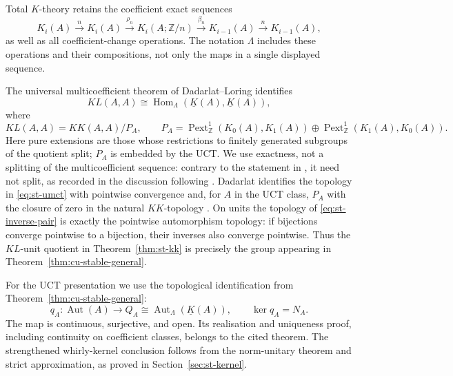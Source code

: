 Total $K$-theory retains the coefficient exact sequences 
\begin{equation}  \label{eq:st-bockstein}
K_i(A)\xrightarrow{n}K_i(A) \xrightarrow{\rho_n}K_i(A;\mathbb{Z}/n) \xrightarrow{\beta_n}K_{i-1}(A) \xrightarrow{n}K_{i-1}(A),
\end{equation}
as well as all coefficient-change operations. The notation $\Lambda$
includes these operations and their compositions, not only the maps in a
single displayed sequence.

The universal multicoefficient theorem of Dadarlat--Loring \cite{DadarlatLoring1996}
identifies 
\begin{equation}  \label{eq:st-umct}
KL(A,A)\cong\operatorname{Hom}_\Lambda(\underline K(A),\underline K(A)),
\end{equation}
where 
\begin{equation*}
KL(A,A)=KK(A,A)/P_A,\qquad  P_A=\operatorname{Pext}^1_\mathbb{Z}(K_0(A),K_1(A))  \oplus \operatorname{Pext}^1_\mathbb{Z}(K_1(A),K_0(A)). 
\end{equation*}
Here pure extensions are those whose restrictions to finitely generated
subgroups of the quotient split; $P_A$ is embedded by the UCT. We use
exactness, not a splitting of the multicoefficient sequence: contrary to the
statement in \cite{DadarlatLoring1996}, it need not split, as recorded in the discussion
following \cite[Theorem~1.3]{EilersRestorffRuiz2011}. Dadarlat identifies the topology in \eqref{eq:st-umct} with pointwise
convergence and, for $A$ in the UCT class, $P_A$ with the closure of zero
in the natural $KK$-topology \cite[Theorem~4.1 and p.~411]{Dadarlat2005}. On
units the topology of \eqref{eq:st-inverse-pair} is exactly the pointwise
automorphism topology: if bijections converge pointwise to a bijection,
their inverses also converge pointwise. Thus the $KL$-unit quotient in
Theorem~\ref{thm:st-kk} is precisely the group appearing in Theorem~\ref{thm:cu-stable-general}.

For the UCT presentation we use the topological identification from
Theorem~\ref{thm:cu-stable-general}:
\[
 q_A:\operatorname{Aut}(A)\longrightarrow Q_A\cong\operatorname{Aut}_\Lambda(\underline K(A)),
 \qquad \ker q_A=N_A.
\]
The map is continuous, surjective, and open. Its realisation and
uniqueness proof, including continuity on coefficient classes, belongs
to the cited theorem. The strengthened whirly-kernel conclusion follows
from the norm-unitary theorem and strict approximation, as proved in
Section~\ref{sec:st-kernel}.


